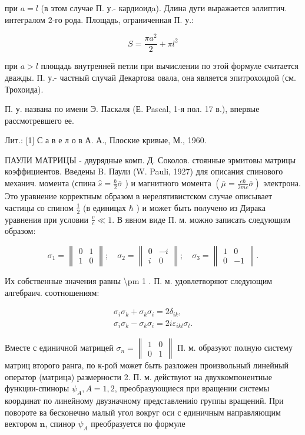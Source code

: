\documentclass[10pt]{article}
\begin{document}
при $a=l$ (в этом случае П. у.- кардиоидa). Длина дуги выражается эллиптич. интегралом 2-го рода. Площадь, ограниченная П. у.:

\[
S=\frac{\pi a^{2}}{2}+\pi l^{2}
\]

при $a>l$ площадь внутренней петли при вычислении по этой формуле считается дважды. П. у.- частный случай Декартова овала, она является эпитрохоидой (см. Трохоида).

П. у. названа по имени Э. Паскаля (Е. Pascal, 1-я пол. 17 в.), впервые рассмотревшего ее.

Лит.: [1] С а в е л о в А. А., Плоские кривые, М., 1960.

ПАУЛИ МАТРИЦЫ - двурядные комп. Д. Соколов. стоянные эрмитовы матрицы коэффициентов. Введены B. Паули (W. Pauli, 1927) для описания спинового механич. момента (спина $\hat{s}=\frac{\hbar}{2} \bar{\sigma}$ ) и магнитного момента $\left(\bar{\mu}=\frac{e \hbar}{2 m c} \bar{\sigma}\right)$ электрона. Это уравнение корректным образом в нерелятивистском случае описывает частицы со спином $\frac{1}{2}$ (в единицах $\hbar$ ) и может быть получено из Дирака уравнения при условии $\frac{v}{c} \ll 1$. В явном виде П. м. можно записать следующим образом:

\[
\sigma_{1}=\left\|\begin{array}{ll}
0 & 1 \\
1 & 0
\end{array}\right\| ; \quad \sigma_{2}=\left\|\begin{array}{rr}
0 & -i \\
i & 0
\end{array}\right\| ; \quad \sigma_{3}=\left\|\begin{array}{rr}
1 & 0 \\
0 & -1
\end{array}\right\| .
\]

Их собственные значения равны \textbackslash pm 1 . П. м. удовлетворяют следующим алгебраич. соотношениям:

\[
\begin{gathered}
\sigma_{i} \sigma_{k}+\sigma_{k} \sigma_{i}=2 \delta_{i k}, \\
\sigma_{i} \sigma_{k}-\sigma_{k} \sigma_{i}=2 i \varepsilon_{i k l} \sigma_{l} .
\end{gathered}
\]

Вместе с единичной матрицей $\sigma_{n}=\left\|\begin{array}{ll}1 & 0 \\ 0 & 1\end{array}\right\|$ П. м. образуют полную систему матриц второго ранга, по к-рой может быть разложен произвольный линейный оператор (матрица) размерности 2. П. м. действуют на двухкомпонентные функции-спиноры $\psi_{A}, A=1,2$, преобразующиеся при вращении системы координат по линейному двузначному представлениіо группы вращений. При повороте ва бесконечно малый угол вокруг оси с единичным направляющим вектором $\boldsymbol{n}$, спинор $\psi_{A}$ преобразуется по формуле
\end{document}
